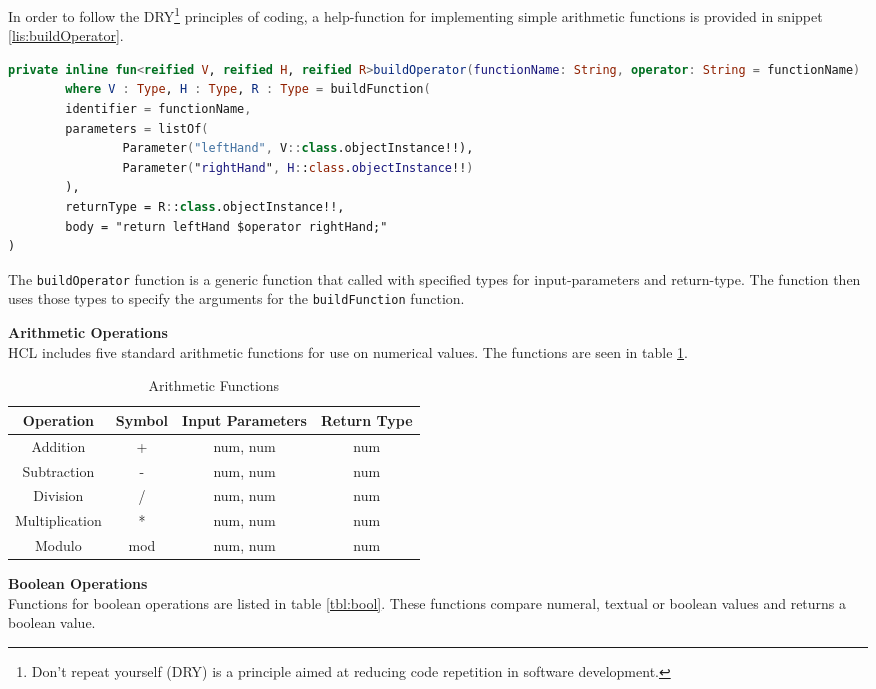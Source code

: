 In order to follow the DRY\footnote{Don't repeat yourself (DRY) is a principle aimed at reducing code repetition in software development.
} principles of coding, a help-function for implementing simple arithmetic functions is provided in snippet \ref{lis:buildOperator}.
\begin{lstlisting}[language=Kotlin,label=lis:buildOperator,caption=The implementation of buildOperator.]
private inline fun<reified V, reified H, reified R>buildOperator(functionName: String, operator: String = functionName)
        where V : Type, H : Type, R : Type = buildFunction(
        identifier = functionName,
        parameters = listOf(
                Parameter("leftHand", V::class.objectInstance!!),
                Parameter("rightHand", H::class.objectInstance!!)
        ),
        returnType = R::class.objectInstance!!,
        body = "return leftHand $operator rightHand;"
)
\end{lstlisting}
The \texttt{buildOperator} function is a generic function that called with specified types for input-parameters and return-type. 
The function then uses those types to specify the arguments for the \texttt{buildFunction} function.

\textbf{Arithmetic Operations}\\
HCL includes five standard arithmetic functions for use on numerical values.
The functions are seen in table \ref{tbl:arith}.

\begin{table}[h]
	\centering
	\caption{Arithmetic Functions}
	\label{tbl:arith}
	\begin{tabular}{|c|c|c|c|}
		\hline
		Operation      & Symbol & Input Parameters & Return Type \\ \hline
		Addition       & +      & num, num         & num         \\ \hline
		Subtraction    & -      & num, num         & num         \\ \hline
		Division       & /      & num, num         & num         \\ \hline
		Multiplication & *      & num, num         & num         \\ \hline
		Modulo         & mod    & num, num         & num         \\ \hline
	\end{tabular}
\end{table}

\textbf{Boolean Operations}\\
Functions for boolean operations are listed in table \ref{tbl:bool}.
These functions compare numeral, textual or boolean values and returns a boolean value.

